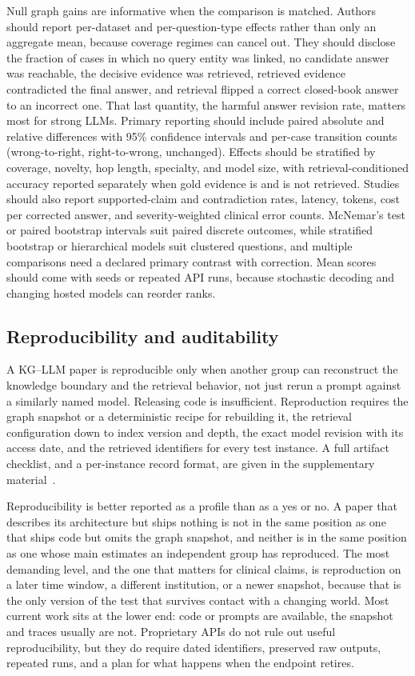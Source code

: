 Null graph gains are informative when the comparison is matched. Authors should report per-dataset and per-question-type effects rather than only an aggregate mean, because coverage regimes can cancel out. They should disclose the fraction of cases in which no query entity was linked, no candidate answer was reachable, the decisive evidence was retrieved, retrieved evidence contradicted the final answer, and retrieval flipped a correct closed-book answer to an incorrect one. That last quantity, the harmful answer revision rate, matters most for strong LLMs. Primary reporting should include paired absolute and relative differences with 95\% confidence intervals and per-case transition counts (wrong-to-right, right-to-wrong, unchanged). Effects should be stratified by coverage, novelty, hop length, specialty, and model size, with retrieval-conditioned accuracy reported separately when gold evidence is and is not retrieved. Studies should also report supported-claim and contradiction rates, latency, tokens, cost per corrected answer, and severity-weighted clinical error counts. McNemar's test or paired bootstrap intervals suit paired discrete outcomes, while stratified bootstrap or hierarchical models suit clustered questions, and multiple comparisons need a declared primary contrast with correction. Mean scores should come with seeds or repeated API runs, because stochastic decoding and changing hosted models can reorder ranks.

\subsection{Reproducibility and auditability}

A KG--LLM paper is reproducible only when another group can reconstruct the knowledge boundary and the retrieval behavior, not just rerun a prompt against a similarly named model. Releasing code is insufficient. Reproduction requires the graph snapshot or a deterministic recipe for rebuilding it, the retrieval configuration down to index version and depth, the exact model revision with its access date, and the retrieved identifiers for every test instance. A full artifact checklist, and a per-instance record format, are given in the supplementary material~\cite{supplementary}.

Reproducibility is better reported as a profile than as a yes or no. A paper that describes its architecture but ships nothing is not in the same position as one that ships code but omits the graph snapshot, and neither is in the same position as one whose main estimates an independent group has reproduced. The most demanding level, and the one that matters for clinical claims, is reproduction on a later time window, a different institution, or a newer snapshot, because that is the only version of the test that survives contact with a changing world. Most current work sits at the lower end: code or prompts are available, the snapshot and traces usually are not. Proprietary APIs do not rule out useful reproducibility, but they do require dated identifiers, preserved raw outputs, repeated runs, and a plan for what happens when the endpoint retires.

